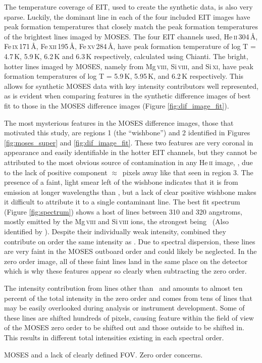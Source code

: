 	The temperature coverage of EIT, used to create the synthetic data, is also very sparse.
	Luckily, the dominant line in each of the four included EIT images have peak formation temperatures that closely match the peak formation temperatures of the brightest lines imaged by MOSES.  
	The four EIT channels used, He\,\textsc{ii}\,304\,\AA, Fe\,\textsc{ix}\,171\,\AA,  Fe\,\textsc{xii}\,195\,\AA, Fe\,\textsc{xv}\,284\,\AA, have peak formation temperature of log T = 4.7\,K, 5.9\,K, 6.2\,K and 6.3\,K respectively, calculated using Chianti.  
	The bright, hotter lines imaged by MOSES, namely from Mg\,\textsc{viii}, Si\,\textsc{viii}, and Si\,\textsc{xi}, have peak formation temperatures of log T = 5.9\,K, 5.95\,K, and 6.2\,K respectively. 
	This allows for synthetic MOSES data with key intensity contributors well represented, as is evident when comparing features in the synthetic difference images of best fit to those in the MOSES difference images (Figure \ref{fig:dif_image_fit}).
	
	The most mysterious features in the MOSES difference images, those that motivated this study, are regions 1 (the ``wishbone'') and 2 identified in Figures \ref{fig:moses_super} and \ref{fig:dif_image_fit}.
	These two features are very coronal in appearance and easily identifiable in the hotter EIT channels, but they cannot be attributed to the most obvious source of contamination in any He\,\textsc{ii} image, \sixi, due to the lack of positive component $\approx$\sixipix\ pixels away like that seen in region 3.
	The presence of a faint, light smear left of the wishbone indicates that it is from emission at longer wavelengths than \heii, but a lack of clear positive wishbone makes it difficult to attribute it to a single contaminant line.
	The best fit spectrum (Figure \ref{fig:spectrum}) shows a host of lines between 310 and 320 angstroms, mostly emitted by the Mg\,\textsc{viii} and Si\,\textsc{viii} ions, the strongest being \ (Also identified by \citet{Rust2017}).
	Despite their individually weak intensity, combined they contribute on order the same intensity as \sixi.
	Due to spectral dispersion, these lines are very faint in the MOSES outboard order and could likely be neglected.
	In the zero order image, all of these faint lines land in the same place on the detector which is why these features appear so clearly when subtracting the zero order.
	
	The intensity contribution from lines other than \heii\ and \sixi amounts to almost ten percent of the total intensity in the zero order and comes from tens of lines that may be easily overlooked during analysis or instrument development.
	Some of these lines are shifted hundreds of pixels, causing feature within the field of view of the MOSES zero order to be shifted out and those outside to be shifted in.
	This results in different total intensities existing in each spectral order.
	
	
	MOSES and a lack of clearly defined FOV.  
	Zero order concerns.
	
	

	
	
	
	


